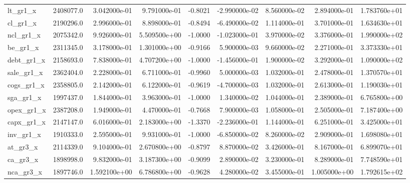 \documentclass[10pt]{article}
\begin{document}
\begin{landscape}
\begin{longtable}{|l|r|r|r|r|r|r|r|r|}
lt\_gr1\_x                &  2408077.0 &  3.042000e-01 &  9.791000e-01 &     -0.8021 & -2.990000e-02 &  8.560000e-02 &  2.894000e-01 &  1.783760e+01 \\
cl\_gr1\_x                &  2190296.0 &  2.996000e-01 &  8.898000e-01 &     -0.8494 & -6.490000e-02 &  1.114000e-01 &  3.701000e-01 &  1.634630e+01 \\
ncl\_gr1\_x               &  2075342.0 &  9.926000e-01 &  5.509500e+00 &     -1.0000 & -1.023000e-01 &  3.970000e-02 &  3.376000e-01 &  1.990000e+02 \\
be\_gr1\_x                &  2311345.0 &  3.178000e-01 &  1.301000e+00 &     -0.9166 &  5.900000e-03 &  9.660000e-02 &  2.271000e-01 &  3.373330e+01 \\
debt\_gr1\_x              &  2158693.0 &  7.838000e-01 &  4.707200e+00 &     -1.0000 & -1.456000e-01 &  1.900000e-02 &  3.292000e-01 &  1.090000e+02 \\
sale\_gr1\_x              &  2362404.0 &  2.228000e-01 &  6.711000e-01 &     -0.9960 &  5.000000e-03 &  1.032000e-01 &  2.478000e-01 &  1.370570e+01 \\
cogs\_gr1\_x              &  2358805.0 &  2.142000e-01 &  6.122000e-01 &     -0.9619 & -4.700000e-03 &  1.032000e-01 &  2.613000e-01 &  1.190030e+01 \\
sga\_gr1\_x               &  1997437.0 &  1.844000e-01 &  3.963000e-01 &     -1.0000 &  1.340000e-02 &  1.044000e-01 &  2.389000e-01 &  6.765800e+00 \\
opex\_gr1\_x              &  2387208.0 &  1.949000e-01 &  4.470000e-01 &     -0.7668 &  7.900000e-03 &  1.058000e-01 &  2.505000e-01 &  7.187400e+00 \\
capx\_gr1\_x              &  2147147.0 &  6.016000e-01 &  2.183000e+00 &     -1.3370 & -2.236000e-01 &  1.144000e-01 &  6.251000e-01 &  3.425000e+01 \\
inv\_gr1\_x               &  1910333.0 &  2.595000e-01 &  9.931000e-01 &     -1.0000 & -6.850000e-02 &  8.260000e-02 &  2.909000e-01 &  1.698080e+01 \\
at\_gr3\_x                &  2114339.0 &  9.104000e-01 &  2.670800e+00 &     -0.8797 &  8.870000e-02 &  3.426000e-01 &  8.167000e-01 &  6.899070e+01 \\
ca\_gr3\_x                &  1898998.0 &  9.832000e-01 &  3.187300e+00 &     -0.9099 &  2.890000e-02 &  3.230000e-01 &  8.289000e-01 &  7.748590e+01 \\
nca\_gr3\_x               &  1897746.0 &  1.592100e+00 &  6.786800e+00 &     -0.9628 &  4.280000e-02 &  3.455000e-01 &  1.005000e+00 &  1.792615e+02 \\

\end{longtable}
\end{landscape}
\end{document}
